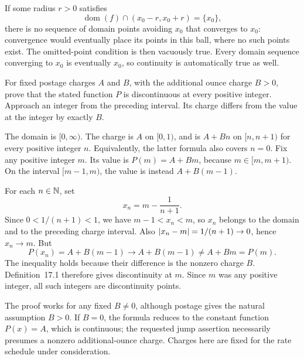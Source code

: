 If some radius $r>0$ satisfies
\[
 \operatorname{dom}(f)\cap(x_0-r,x_0+r)=\{x_0\},
\]
there is no sequence of domain points avoiding $x_0$ that
converges to $x_0$: convergence would eventually place its
points in this ball, where no such points exist.
The omitted-point condition is then vacuously true.
Every domain sequence converging to $x_0$ is eventually
$x_0$, so continuity is automatically true as well.

\goal For fixed postage charges $A$ and $B$, with the additional
ounce charge $B>0$, prove that the stated function $P$ is
discontinuous at every positive integer.
\idea Approach an integer from the preceding interval. Its
charge differs from the value at the integer by exactly $B$.

The domain is $[0,\infty)$. The charge is $A$ on $[0,1)$,
and is $A+Bn$ on $[n,n+1)$ for every positive integer $n$.
Equivalently, the latter formula also covers $n=0$.
Fix any positive integer $m$. Its value is
$P(m)=A+Bm$, because $m\in[m,m+1)$.
On the interval $[m-1,m)$, the value is instead
$A+B(m-1)$.

For each $n\in\mathbb{N}$, set
\[
 x_n=m-\frac1{n+1}.
\]
Since $0<1/(n+1)<1$, we have $m-1<x_n<m$, so $x_n$
belongs to the domain and to the preceding charge interval.
Also $\left|x_n-m\right|=1/(n+1)\to0$, hence $x_n\to m$.
But
\[
 P(x_n)=A+B(m-1)\longrightarrow A+B(m-1)\ne A+Bm=P(m).
\]
The inequality holds because their difference is the nonzero
charge $B$. Definition~17.1 therefore gives discontinuity at $m$.
Since $m$ was any positive integer, all such integers are
discontinuity points.

The proof works for any fixed $B\ne0$, although postage gives
the natural assumption $B>0$. If $B=0$, the formula reduces
to the constant function $P(x)=A$, which is continuous;
the requested jump assertion necessarily presumes a nonzero
additional-ounce charge. Charges here are fixed for the rate
schedule under consideration.
